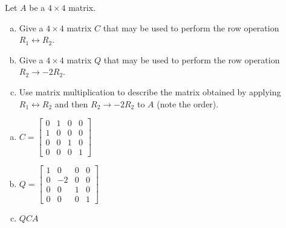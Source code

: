 
\begin{exerciseStatement}


Let \(A\) be a \(4 \times 4\) matrix.


\begin{enumerate}[(a)]
\item Give a \(4 \times 4\) matrix \(C\) that may be used to perform the row operation \( R_1 \leftrightarrow R_2 \).
\item Give a \(4 \times 4\) matrix \(Q\) that may be used to perform the row operation \( R_2 \to -2R_2 \).
\item Use matrix multiplication to describe the matrix obtained by applying \( R_1 \leftrightarrow R_2 \) and then \( R_2 \to -2R_2 \) to \(A\) (note the order). 
\end{enumerate}
    
\end{exerciseStatement}
    
\begin{exerciseAnswer} 

\begin{enumerate}[(a)]
\item \(C= \left[\begin{array}{cccc}
0 & 1 & 0 & 0 \\
1 & 0 & 0 & 0 \\
0 & 0 & 1 & 0 \\
0 & 0 & 0 & 1
\end{array}\right] \)
\item \(Q= \left[\begin{array}{cccc}
1 & 0 & 0 & 0 \\
0 & -2 & 0 & 0 \\
0 & 0 & 1 & 0 \\
0 & 0 & 0 & 1
\end{array}\right] \)
\item \(QCA\)
\end{enumerate}
    
\end{exerciseAnswer}
    
